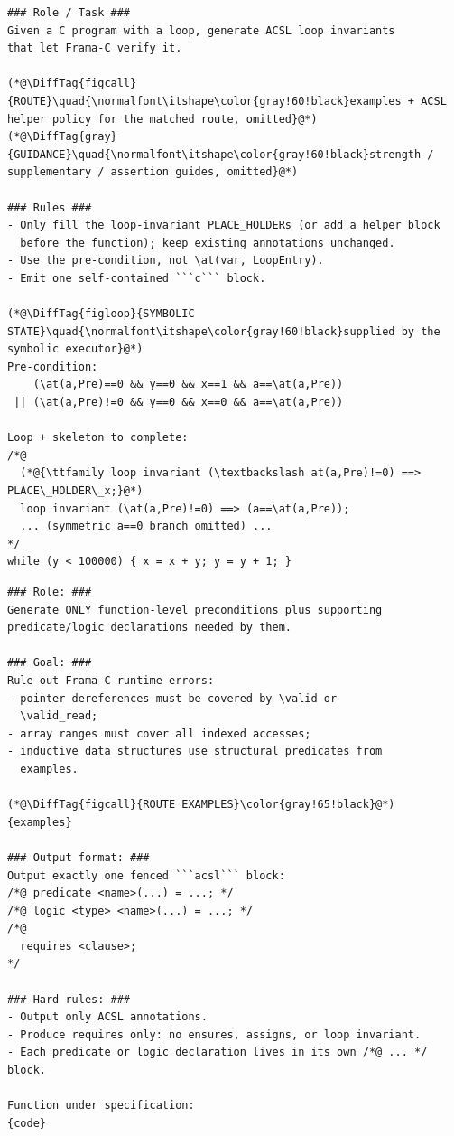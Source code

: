 \begin{tcolorbox}[promptboxcompact, title={Loop-invariant generation prompt}]
\begin{lstlisting}[style=PromptInnerCompact]
### Role / Task ###
Given a C program with a loop, generate ACSL loop invariants
that let Frama-C verify it.

(*@\DiffTag{figcall}{ROUTE}\quad{\normalfont\itshape\color{gray!60!black}examples + ACSL helper policy for the matched route, omitted}@*)
(*@\DiffTag{gray}{GUIDANCE}\quad{\normalfont\itshape\color{gray!60!black}strength / supplementary / assertion guides, omitted}@*)

### Rules ###
- Only fill the loop-invariant PLACE_HOLDERs (or add a helper block
  before the function); keep existing annotations unchanged.
- Use the pre-condition, not \at(var, LoopEntry).
- Emit one self-contained ```c``` block.

(*@\DiffTag{figloop}{SYMBOLIC STATE}\quad{\normalfont\itshape\color{gray!60!black}supplied by the symbolic executor}@*)
Pre-condition:
    (\at(a,Pre)==0 && y==0 && x==1 && a==\at(a,Pre))
 || (\at(a,Pre)!=0 && y==0 && x==0 && a==\at(a,Pre))

Loop + skeleton to complete:
/*@
  (*@{\ttfamily loop invariant (\textbackslash at(a,Pre)!=0) ==> PLACE\_HOLDER\_x;}@*)
  loop invariant (\at(a,Pre)!=0) ==> (a==\at(a,Pre));
  ... (symmetric a==0 branch omitted) ...
*/
while (y < 100000) { x = x + y; y = y + 1; }
\end{lstlisting}
\end{tcolorbox}

\leavevmode\par\nobreak\vspace{6pt}

\begin{tcolorbox}[promptboxcompact, title={Precondition fallback prompt}]
\begin{lstlisting}[style=PromptInnerCompact]
### Role: ###
Generate ONLY function-level preconditions plus supporting
predicate/logic declarations needed by them.

### Goal: ###
Rule out Frama-C runtime errors:
- pointer dereferences must be covered by \valid or
  \valid_read;
- array ranges must cover all indexed accesses;
- inductive data structures use structural predicates from
  examples.

(*@\DiffTag{figcall}{ROUTE EXAMPLES}\color{gray!65!black}@*)
{examples}

### Output format: ###
Output exactly one fenced ```acsl``` block:
/*@ predicate <name>(...) = ...; */
/*@ logic <type> <name>(...) = ...; */
/*@
  requires <clause>;
*/

### Hard rules: ###
- Output only ACSL annotations.
- Produce requires only: no ensures, assigns, or loop invariant.
- Each predicate or logic declaration lives in its own /*@ ... */ block.

Function under specification:
{code}
\end{lstlisting}
\end{tcolorbox}

